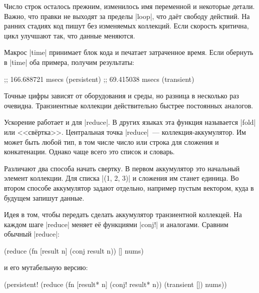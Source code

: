 Число строк осталось прежним, изменилось имя переменной и некоторые
детали. Важно, что правки не выходят за пределы \spverb|loop|, что даёт свободу
действий. На ранних стадиях код пишут без изменяемых коллекций. Если скорость
критична, цикл улучшают так, что данные меняются.

Макрос \spverb|time| принимает блок кода и печатает затраченное время. Если
обернуть в \spverb|time| оба примера, получим результаты:

\begin{english}
  \begin{text}
;; 166.688721 msecs (persistent)
;;  69.415038 msecs (transient)
  \end{text}
\end{english}

Точные цифры зависят от оборудования и среды, но разница в несколько раз
очевидна. Транзиентные коллекции действительно быстрее постоянных аналогов.


Ускорение работает и для \spverb|reduce|. В других языках эта функция называется
\spverb|fold| или <<св\"{е}ртка>>. Центральная точка \spverb|reduce|~---
коллекция-аккумулятор. Им может быть любой тип, в том числе число или строка для
сложения и конкатенации. Однако чаще всего это список и словарь.

Различают два способа начать свертку. В первом аккумулятор это начальный
элемент коллекции. Для списка \spverb|(1, 2, 3)| и сложения им станет
единица. Во втором способе аккумулятор задают отдельно, например пустым вектором, куда в
будущем запишут данные.

Идея в том, чтобы передать сделать аккумулятор транзиентной коллекцей. На каждом
шаге \spverb|reduce| меняет е\"{е} функциями \spverb|conj!| и аналогами. Сравним
обычный \spverb|reduce|:

\begin{english}
  \begin{clojure}
(reduce
 (fn [result n]
   (conj result n))
 []
 nums)
  \end{clojure}
\end{english}

\noindent
и его мутабельную версию:

\begin{english}
  \begin{clojure}
(persistent!
 (reduce
  (fn [result* n]
    (conj! result* n))
  (transient [])
  nums))
  \end{clojure}
\end{english}

